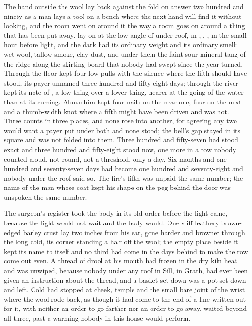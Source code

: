 
The hand outside the wool lay back against the fold on answer two hundred and ninety as a man lays a tool on a bench where the next hand will find it without looking, and the room went on around it the way a room goes on around a thing that has been put away.  lay on  at the low angle of  under  roof, in , , , in the small hour before light, and the dark had its ordinary weight and its ordinary smell: wet wool, tallow smoke, clay dust, and under them the faint sour mineral tang of the ridge along the skirting board that nobody had swept since the year turned. Through the floor  kept four low pulls with the silence where the fifth should have stood, its payer unnamed three hundred and fifty-eight days; through  the river kept its note of , a low thing over a lower thing, nearer at the going of the water than at its coming. Above him  kept four nails on the near one, four on the next and a thumb-width knot where a fifth might have been driven and was not. Three counts in three places, and none rose into another, for agreeing any two would want a payer put under both and none stood; the bell's gap stayed in its square and was not folded into them. Three hundred and fifty-seven had stood exact and three hundred and fifty-eight stood now, one more in a row nobody counted aloud, not round, not a threshold, only a day. Six months and one hundred and seventy-seven days had become one hundred and seventy-eight and nobody under the roof said so. The fire's fifth was unpaid the same number; the name of the man whose coat kept his shape on the peg behind the door was unspoken the same number.

The surgeon's register took the body in its old order before the light came, because the light would not wait and the body would. One stiff leathery brown-edged barley crust lay two inches from his ear, gone harder and browner through the long cold, its corner standing a hair off the wool; the empty place beside it kept its name to itself and no third had come in the days behind to make the row come out even. A thread of drool at his mouth had frozen in the dry kiln heat and was unwiped, because nobody under any roof in Sill, in Grath, had ever been given an instruction about the thread, and a basket set down was a pot set down and left. Cold had stopped at cheek, temple and the small bare joint of the wrist where the wool rode back, as though it had come to the end of a line written out for it, with neither an order to go farther nor an order to go away.  waited beyond all three, past a warming nobody in this house would perform.

